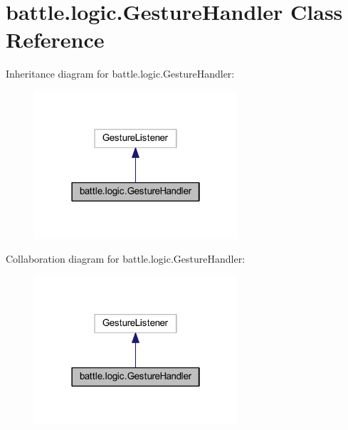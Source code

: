 \hypertarget{classbattle_1_1logic_1_1_gesture_handler}{}\section{battle.\+logic.\+Gesture\+Handler Class Reference}
\label{classbattle_1_1logic_1_1_gesture_handler}


Inheritance diagram for battle.\+logic.\+Gesture\+Handler\+:
\nopagebreak
\begin{figure}[H]
\begin{center}
\leavevmode
\includegraphics[width=214pt]{classbattle_1_1logic_1_1_gesture_handler__inherit__graph}
\end{center}
\end{figure}


Collaboration diagram for battle.\+logic.\+Gesture\+Handler\+:
\nopagebreak
\begin{figure}[H]
\begin{center}
\leavevmode
\includegraphics[width=214pt]{classbattle_1_1logic_1_1_gesture_handler__coll__graph}
\end{center}
\end{figure}
